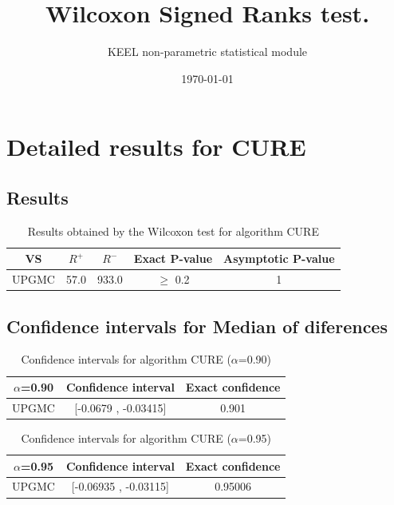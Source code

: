 \documentclass[a4paper,10pt]{article}
\title{Wilcoxon Signed Ranks test.}
\date{\today}
\author{KEEL non-parametric statistical module}
\begin{document}
\pagestyle{empty}
\maketitle
\thispagestyle{empty}



\section{Detailed results for CURE}


\subsection{Results}

\begin{table}[!htp]
\centering\small
\begin{tabular}{
|c|c|c|c|c|}
\hline
 VS & $R^{+}$ & $R^{-}$ & Exact P-value & Asymptotic P-value \\ \hline 
UPGMC & 57.0 & 933.0 & $\geq$ 0.2 & 1\\ \hline 

\end{tabular}
\caption{Results obtained by the Wilcoxon test for algorithm CURE}
\end{table}

\subsection{Confidence intervals for Median of diferences}

\begin{table}[!htp]
\centering\small
\begin{tabular}{
|c|c|c|}
\hline
 $\alpha$=0.90 & Confidence interval & Exact confidence \\ \hline 
UPGMC & [-0.0679 , -0.03415] & 0.901\\ \hline 

\end{tabular}
\caption{Confidence intervals for algorithm CURE ($\alpha$=0.90)}
\end{table}
\begin{table}[!htp]
\centering\small
\begin{tabular}{
|c|c|c|}
\hline
 $\alpha$=0.95 & Confidence interval & Exact confidence \\ \hline 
UPGMC & [-0.06935 , -0.03115] & 0.95006\\ \hline 

\end{tabular}
\caption{Confidence intervals for algorithm CURE ($\alpha$=0.95)}
\end{table}
\end{document}
